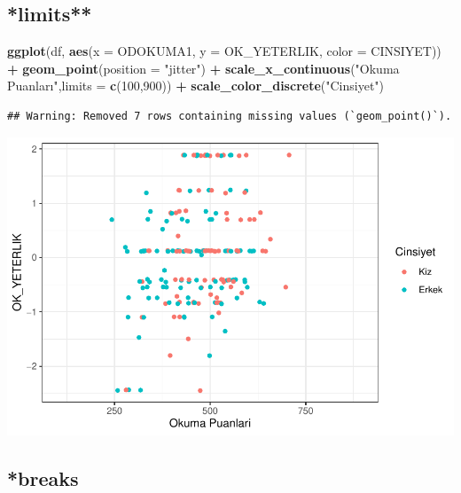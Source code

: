 \documentclass[
  oneside]{book}
\newenvironment{Shaded}{\begin{snugshade}}{\end{snugshade}}
\newcommand{\AttributeTok}[1]{\textcolor[rgb]{0.13,0.29,0.53}{#1}}
\newcommand{\DecValTok}[1]{\textcolor[rgb]{0.00,0.00,0.81}{#1}}
\newcommand{\FunctionTok}[1]{\textcolor[rgb]{0.13,0.29,0.53}{\textbf{#1}}}
\newcommand{\NormalTok}[1]{#1}
\newcommand{\SpecialCharTok}[1]{\textcolor[rgb]{0.81,0.36,0.00}{\textbf{#1}}}
\newcommand{\StringTok}[1]{\textcolor[rgb]{0.31,0.60,0.02}{#1}}
\begin{document}
\hypertarget{limits}{%
\subsection{*limits**}\label{limits}}

\begin{Shaded}
\begin{Highlighting}[]
\FunctionTok{ggplot}\NormalTok{(df, }\FunctionTok{aes}\NormalTok{(}\AttributeTok{x =}\NormalTok{ ODOKUMA1,}
\AttributeTok{y =}\NormalTok{ OK\_YETERLIK,}
\AttributeTok{color =}\NormalTok{ CINSIYET)) }\SpecialCharTok{+}
\FunctionTok{geom\_point}\NormalTok{(}\AttributeTok{position =} \StringTok{"jitter"}\NormalTok{) }\SpecialCharTok{+}
\FunctionTok{scale\_x\_continuous}\NormalTok{(}\StringTok{"Okuma Puanları"}\NormalTok{,}\AttributeTok{limits =} \FunctionTok{c}\NormalTok{(}\DecValTok{100}\NormalTok{,}\DecValTok{900}\NormalTok{)) }\SpecialCharTok{+}
\FunctionTok{scale\_color\_discrete}\NormalTok{(}\StringTok{"Cinsiyet"}\NormalTok{)}
\end{Highlighting}
\end{Shaded}

\begin{verbatim}
## Warning: Removed 7 rows containing missing values (`geom_point()`).
\end{verbatim}

\begin{center}\includegraphics[width=1\linewidth]{15-betimleyici-istatistik_files/figure-latex/unnamed-chunk-52-1} \end{center}

\hypertarget{breaks}{%
\subsection{*breaks}\label{breaks}}
\end{document}
